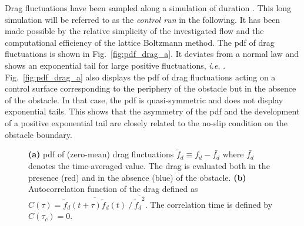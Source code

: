 \documentclass{jfm}
\newcommand{\EL}[1]{{\color{myred}{#1}}}
\begin{document}
Drag fluctuations have been sampled along a simulation of duration \EL{$T_{tot} = 4\times 10^6~T_0$}.
This long simulation will be referred to as the \textit{control run} in the following.
It has been made possible by the relative simplicity of the investigated flow and the computational efficiency of the lattice Boltzmann method.
The \ac{pdf} of drag fluctuations is shown in Fig.~\ref{fig:pdf_drag_a}.
It deviates from a normal law and shows an exponential tail for large positive fluctuations, \textit{i.e.}  \EL{${\mathbb{P}}(f_d) \propto e^{-\ell f_d}$}.
% 
Fig.~\ref{fig:pdf_drag_a} also displays the \ac{pdf} of drag fluctuations acting on a control surface corresponding to the periphery of the obstacle but in the absence of the obstacle.
% 
In that case, the \ac{pdf} is quasi-symmetric and does not display exponential tails. This shows that the asymmetry of the \ac{pdf} and the development of a positive exponential tail are closely related to the no-slip condition on the obstacle boundary.
\begin{figure}
  \centering
  \caption{\textbf{(a)} \ac{pdf} of (zero-mean) drag fluctuations $\tilde f_d \equiv f_d - \bar{f_d}$ where $\bar{f_d}$ denotes the time-averaged value. The drag is evaluated both in the presence (red) and in the absence (blue) of the obstacle. %
    \textbf{(b)} Autocorrelation function of the drag defined as $C(\tau) = \overline{ \tilde f_d(t+\tau)\tilde f_d(t)} ~/~ \overline{{\tilde f_d}^2}$. The correlation time \EL{$\tau_c\simeq 4 T_0$} is defined by $C(\tau_c)=0$.
  }
  \label{fig:pdf_drag}
\end{figure}
\end{document}
